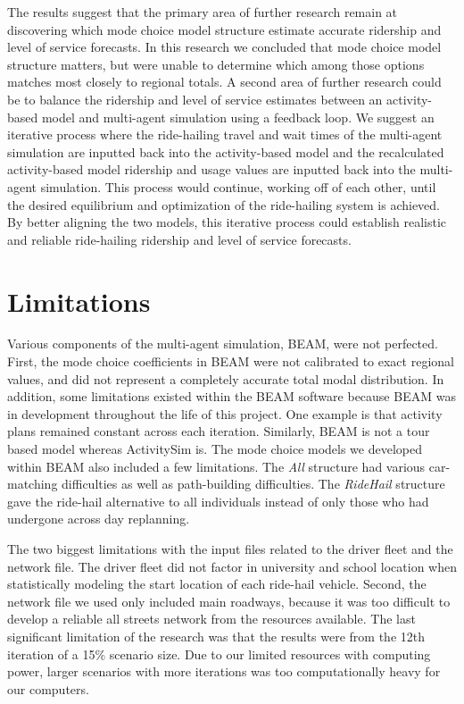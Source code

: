 \documentclass[fancy, masters]{byuthesis}
\begin{document}
The results suggest that the primary area of further research remain at discovering which mode choice model structure estimate accurate ridership and level of service forecasts. In this research we concluded that mode choice model structure matters, but were unable to determine which among those options matches most closely to regional totals. A second area of further research could be to balance the ridership and level of service estimates between an activity-based model and multi-agent simulation using a feedback loop. We suggest an iterative process where the ride-hailing travel and wait times of the multi-agent simulation are inputted back into the activity-based model and the recalculated activity-based model ridership and usage values are inputted back into the multi-agent simulation. This process would continue, working off of each other, until the desired equilibrium and optimization of the ride-hailing system is achieved. By better aligning the two models, this iterative process could establish realistic and reliable ride-hailing ridership and level of service forecasts.

\hypertarget{limitations}{%
\section{Limitations}\label{limitations}}

Various components of the multi-agent simulation, BEAM, were not perfected. First, the mode choice coefficients in BEAM were not calibrated to exact regional values, and did not represent a completely accurate total modal distribution. In addition, some limitations existed within the BEAM software because BEAM was in development throughout the life of this project. One example is that activity plans remained constant across each iteration. Similarly, BEAM is not a tour based model whereas ActivitySim is. The mode choice models we developed within BEAM also included a few limitations. The \emph{All} structure had various car-matching difficulties as well as path-building difficulties. The \emph{RideHail} structure gave the ride-hail alternative to all individuals instead of only those who had undergone across day replanning.

The two biggest limitations with the input files related to the driver fleet and the network file. The driver fleet did not factor in university and school location when statistically modeling the start location of each ride-hail vehicle. Second, the network file we used only included main roadways, because it was too difficult to develop a reliable all streets network from the resources available. The last significant limitation of the research was that the results were from the 12th iteration of a 15\% scenario size. Due to our limited resources with computing power, larger scenarios with more iterations was too computationally heavy for our computers.
\end{document}
